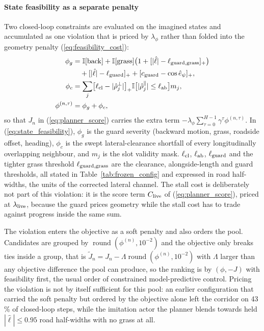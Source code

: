\documentclass[journal]{IEEEtran}
\begin{document}
\paragraph{State feasibility as a separate penalty}
Two closed-loop constraints are evaluated on the imagined states and
accumulated as one violation that is priced by $\lambda_\phi$ rather than
folded into the geometry penalty (\ref{eq:feasibility_cost}):
\begin{equation}
\begin{aligned}
\phi_g&=\mathbb I[\mathrm{back}]+\mathbb I[\mathrm{grass}]\bigl(1+[|\hat\ell|-\ell_{\rm guard,grass}]_+\bigr)\\
 &\quad+[|\hat\ell|-\ell_{\rm guard}]_+ +[c_{\rm guard}-\cos\hat e_\psi]_+,\\
\phi_c&=\sum_{j}\bigl[\ell_{\rm cl}-|\hat\rho_j^{\perp}|\bigr]_+
 \mathbb I\bigl[|\hat\rho_j^{\parallel}|\le\ell_{\rm ab}\bigr]m_j,\\
\phi^{(n,\tau)}&=\phi_g+\phi_c,
\end{aligned}
\label{eq:state_feasibility}
\end{equation}
so that $J_n$ in (\ref{eq:planner_score}) carries the extra term
$-\lambda_\phi\sum_{\tau=0}^{H-1}\gamma^\tau\phi^{(n,\tau)}$.
In (\ref{eq:state_feasibility}), $\phi_g$ is the guard severity (backward
motion, grass, roadside offset, heading), $\phi_c$ is the swept lateral-clearance
shortfall of every longitudinally overlapping neighbour, and $m_j$ is the slot
validity mask. $\ell_{\rm cl}$, $\ell_{\rm ab}$, $\ell_{\rm guard}$ and the
tighter grass threshold $\ell_{\rm guard,grass}$ are the clearance,
alongside-length and guard thresholds, all stated in
Table~\ref{tab:frozen_config} and expressed in road half-widths, the units of
the corrected lateral channel. The stall cost is deliberately not part of this
violation: it is the score term $C_{\rm live}$ of (\ref{eq:planner_score}),
priced at $\lambda_{\rm live}$, because the guard prices geometry while the
stall cost has to trade against progress inside the same sum.

The violation enters the objective as a soft penalty and also orders the pool.
Candidates are grouped by $\operatorname{round}(\phi^{(n)},10^{-2})$ and the
objective only breaks ties inside a group, that is
$\tilde J_n=J_n-\Lambda\operatorname{round}(\phi^{(n)},10^{-2})$ with $\Lambda$
larger than any objective difference the pool can produce, so the ranking is by
$(\phi,-J)$ with feasibility first, the usual order of constrained
model-predictive control. Pricing the violation is not by itself sufficient for
this pool: an earlier configuration that carried the soft penalty but ordered
by the objective alone left the corridor on 43\,\% of closed-loop steps, while
the imitation actor the planner blends towards held $|\hat\ell|\le0.95$ road
half-widths with no grass at all.
\end{document}
